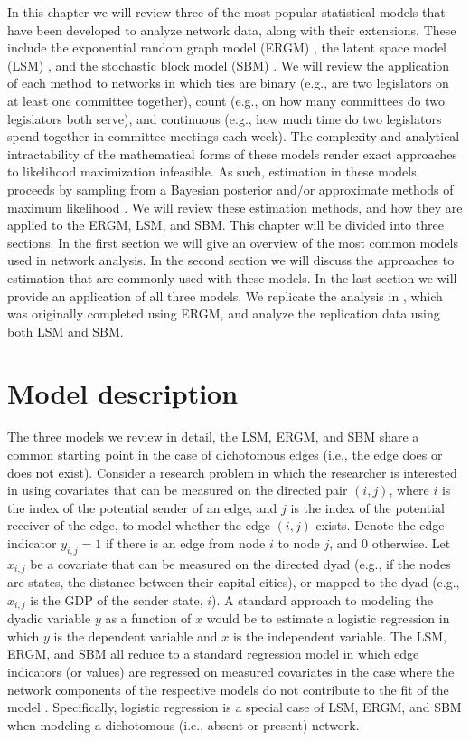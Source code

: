 \documentclass[fleqn,12pt]{wlscirep}
\begin{document}
In this chapter we will review three of the most popular statistical models that have been developed to analyze network data, along with their extensions. These include the exponential random graph model (ERGM) \citep{cranmer2011inferential}, the latent space model (LSM) \citep{dorff2016latent},  and the stochastic block model (SBM) \citep{sweet2015incorporating}. We will review the application of each method to networks in which ties are binary (e.g., are two legislators on at least one committee together), count (e.g., on how many committees do two legislators both serve), and continuous (e.g., how much time do two legislators spend together in committee meetings each week). The complexity and analytical intractability of the mathematical forms of these models render exact approaches to likelihood maximization infeasible. As such, estimation in these models proceeds by sampling from a Bayesian posterior and/or approximate methods of maximum likelihood \citep{raftery2012fast,van2009framework,nowicki2001estimation}. We will review these estimation methods, and how they are applied to the ERGM, LSM, and SBM.  This chapter will be divided into three sections. In the first section we will give an overview of the most common models used in network analysis. In the second section we will discuss the approaches to estimation that are commonly used with these models. In the last section we will provide an application of all three models. We replicate the analysis in \citep{wojcik2017legislative}, which was originally completed using ERGM, and analyze the replication data using both LSM and SBM. 

\section{Model description}

The three models we review in detail, the LSM, ERGM, and SBM share a common starting point in the case of dichotomous edges (i.e., the edge does or does not exist). Consider a research problem in which the researcher is interested in using covariates that can be measured on the directed pair $(i,j)$, where $i$ is the index of the potential sender of an edge, and $j$ is the index of the potential receiver of the edge, to model whether the edge $(i,j)$ exists. Denote the edge indicator $y_{i,j} = 1$  if there is an edge from node $i$ to node $j$, and 0 otherwise. Let $x_{i,j}$ be a covariate that can be measured on the directed dyad (e.g., if the nodes are states, the distance between their capital cities), or mapped to the dyad (e.g., $x_{i,j}$ is the GDP of the sender state, $i$). A standard approach to modeling the dyadic variable $y$ as a function of $x$ would be to estimate a logistic regression in which $y$ is the dependent variable and $x$ is the independent variable. The LSM, ERGM, and SBM all reduce to a standard regression model in which edge indicators (or values) are regressed on measured covariates in the case where the network components of the respective models do not contribute to the fit of the model \citep{lubbers2007comparison,raftery2012fast,sweet2015incorporating}. Specifically, logistic regression is a special case of LSM, ERGM, and SBM when modeling a dichotomous (i.e., absent or present) network. 
\end{document}
